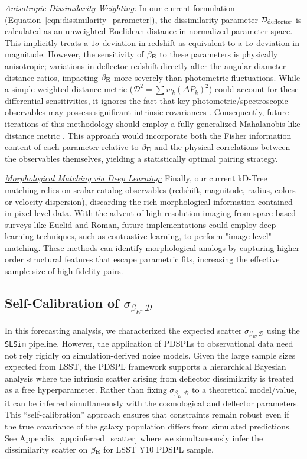 \documentclass[a4paper,11pt]{article}
\begin{document}
\noindent \underline{\textit{Anisotropic Dissimilarity Weighting:}}
In our current formulation (Equation~\ref{eqn:dissimilarity_parameter}), the dissimilarity parameter $\mathcal{D}_{\rm deflector}$ is calculated as an unweighted Euclidean distance in normalized parameter space. This implicitly treats a $1\sigma$ deviation in redshift as equivalent to a $1\sigma$ deviation in magnitude. However, the sensitivity of $\beta_{\rm E}$ to these parameters is physically anisotropic; variations in deflector redshift directly alter the angular diameter distance ratios, impacting $\beta_{\rm E}$ more severely than photometric fluctuations. While a simple weighted distance metric ($\mathcal{D}^2 = \sum w_k (\Delta P_k)^2$) could account for these differential sensitivities, it ignores the fact that key photometric/spectroscopic observables may possess significant intrinsic covariances \cite{Bernardi:2003}. Consequently, future iterations of this methodology should employ a fully generalized Mahalanobis-like distance metric \cite{Mahalanobis:1936}. This approach would incorporate both the Fisher information content of each parameter relative to $\beta_{\rm E}$ and the physical correlations between the observables themselves, yielding a statistically optimal pairing strategy.

\noindent \underline{\textit{Morphological Matching via Deep Learning:}} 
Finally, our current kD-Tree matching relies on scalar catalog observables (redshift, magnitude, radius, colors or velocity dispersion), discarding the rich morphological information contained in pixel-level data. With the advent of high-resolution imaging from space based surveys like Euclid and Roman, future implementations could employ deep learning techniques, such as contrastive learning, to perform "image-level" matching. These methods can identify morphological analogs by capturing 
higher-order structural features that escape parametric fits, 
increasing the effective sample size of high-fidelity pairs.

\subsection{Self-Calibration of $\sigma_{\beta_E, \mathcal{D}}$}
In this forecasting analysis, we characterized the expected scatter $\sigma_{\beta_E, \mathcal{D}}$ using the \texttt{SLSim} pipeline. However, the application of PDSPLs to observational data need not rely rigidly on simulation-derived noise models. Given the large sample sizes expected from LSST, the PDSPL framework supports a hierarchical Bayesian analysis where the intrinsic scatter arising from deflector dissimilarity is treated as a free hyperparameter. 
Rather than fixing $\sigma_{\beta_E, \mathcal{D}}$ to a theoretical model/value, it can be inferred simultaneously with the cosmological and deflector parameters. This ``self-calibration'' approach ensures that constraints remain robust even if the true covariance of the galaxy population differs from simulated predictions. See Appendix~\ref{app:inferred_scatter} where we simultaneously infer the dissimilarity scatter on $\beta_{\rm E}$ for LSST Y10 PDSPL sample.
\end{document}
